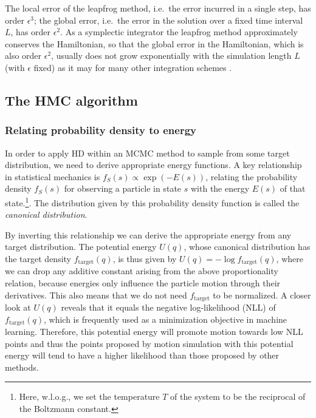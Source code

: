 The local error of the leapfrog method, i.e.\ the error incurred in a single step, has order $\epsilon^3$; the global error, i.e.\ the error in the solution over a fixed time interval $L$, has order $\epsilon^2$. As a symplectic integrator the leapfrog method approximately conserves the Hamiltonian, so that the global error in the Hamiltonian, which is also order $\epsilon^2$, usually does not grow exponentially with the simulation length $L$ (with $\epsilon$ fixed) as it may for many other integration schemes \parencite{Neal2011}.

\subsection{The HMC algorithm}
\label{sec:HMCAlgorithmSection}
\subsubsection{Relating probability density to energy}
In order to apply HD within an MCMC method to sample from some target distribution, we need to derive appropriate energy functions. A key relationship in statistical mechanics is $f_S(s) \propto \exp \left(- E(s) \right)$, relating the probability density $f_S(s)$ for observing a particle in state $s$ with the energy $E(s)$ of that state.\footnote{Here, w.l.o.g., we set the temperature $T$ of the system to be the reciprocal of the Boltzmann constant.}. The distribution given by this probability density function is called the \textit{canonical distribution}.

By inverting this relationship we can derive the appropriate energy from any target distribution. The potential energy $U(q)$, whose canonical distribution has the target density $f_\textrm{target}(q)$, is thus given by $U(q) = -\log f_\textrm{target}(q)$, where we can drop any additive constant arising from the above proportionality relation, because energies only influence the particle motion through their derivatives. This also means that we do not need $f_\textrm{target}$ to be normalized. A closer look at $U(q)$ reveals that it equals the negative log-likelihood (NLL) of $f_\textrm{target}(q)$, which is frequently used as a minimization objective in machine learning. Therefore, this potential energy will promote motion towards low NLL points and thus the points proposed by motion simulation with this potential energy will tend to have a higher likelihood than those proposed by other methods.


